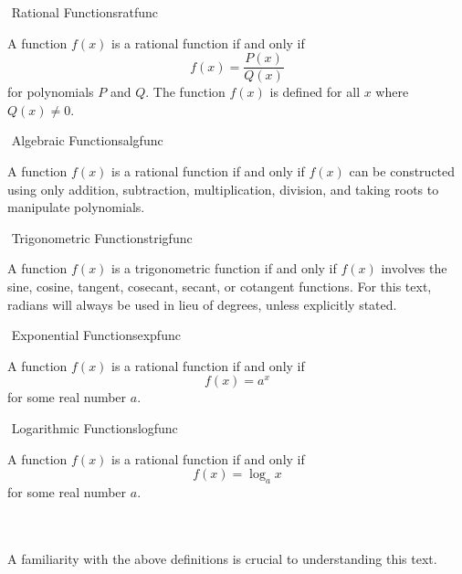 		\begin{definition}{\Stop\,\,Rational Functions}{ratfunc}

			A function \(f(x)\) is a rational function if and only if 
			\begin{equation*}
				f(x)=\frac{P(x)}{Q(x)}
			\end{equation*}
			for polynomials \(P\) and \(Q\). The function \(f(x)\) is defined for all \(x\) where \(Q(x)\neq0\).
			
		\end{definition}
		\begin{definition}{\Stop\,\,Algebraic Functions}{algfunc}

			A function \(f(x)\) is a rational function if and only if \(f(x)\) can be constructed using only addition, subtraction, multiplication, division, and taking roots to manipulate polynomials.
			
		\end{definition}
		\begin{definition}{\Stop\,\,Trigonometric Functions}{trigfunc}

			A function \(f(x)\) is a trigonometric function if and only if \(f(x)\) involves the sine, cosine, tangent, cosecant, secant, or cotangent functions. For this text, radians will always be used in lieu of degrees, unless explicitly stated. 
			
		\end{definition}
		\begin{definition}{\Stop\,\,Exponential Functions}{expfunc}

			A function \(f(x)\) is a rational function if and only if
			\begin{equation*}
				f(x)=a^x
			\end{equation*}
			for some real number \(a\).
			
		\end{definition}
		\begin{definition}{\Stop\,\,Logarithmic Functions}{logfunc}

			A function \(f(x)\) is a rational function if and only if
			\begin{equation*}
				f(x)=\log_ax
			\end{equation*}
			for some real number \(a\).
			
		\end{definition}
		\vphantom
		\\
		\\
		A familiarity with the above definitions is crucial to understanding this text.
